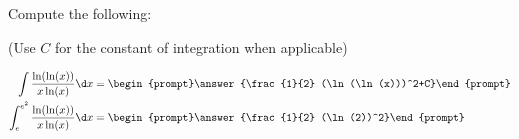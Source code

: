 \documentclass{ximera}
\author{Jim Talamo}
\begin{document}
\begin{exercise}
Compute the following:

\begin{prompt} (Use $C$ for the constant of integration when applicable) \end{prompt}

\begin{align*}
\int \frac{\ln(\ln(x))}{x\ln(x)} \d x &=
\begin{prompt}\answer{\frac{1}{2} (\ln(\ln(x)))^2+C}\end{prompt} \\
\int_e^{e^2} \frac{\ln(\ln(x))}{x\ln(x)} \d x &=\begin{prompt}\answer{\frac{1}{2} (\ln(2))^2}\end{prompt}
\end{align*}
\end{exercise}
\end{document}
